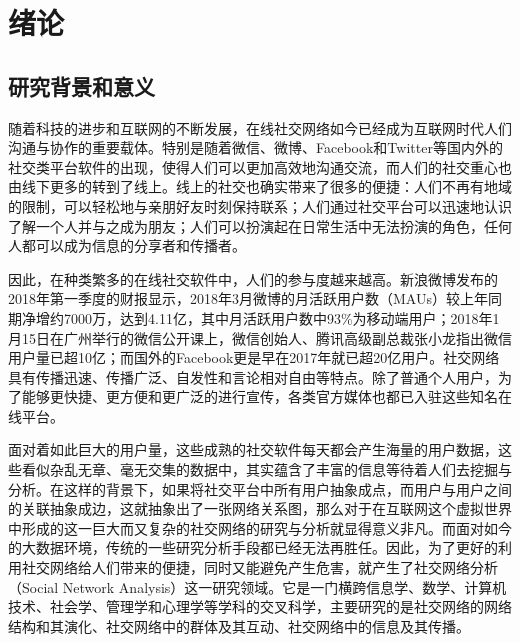 \chapter{绪论}

\section{研究背景和意义}%
随着科技的进步和互联网的不断发展，在线社交网络如今已经成为互联网时代人们沟通与协作的重要载体。特别是随着微信、微博、Facebook和Twitter等国内外的社交类平台软件的出现，使得人们可以更加高效地沟通交流，而人们的社交重心也由线下更多的转到了线上。线上的社交也确实带来了很多的便捷：人们不再有地域的限制，可以轻松地与亲朋好友时刻保持联系；人们通过社交平台可以迅速地认识了解一个人并与之成为朋友；人们可以扮演起在日常生活中无法扮演的角色，任何人都可以成为信息的分享者和传播者。

因此，在种类繁多的在线社交软件中，人们的参与度越来越高。新浪微博发布的2018年第一季度的财报显示，2018年3月微博的月活跃用户数（MAUs）较上年同期净增约7000万，达到4.11亿，其中月活跃用户数中93\%为移动端用户；2018年1月15日在广州举行的微信公开课上，微信创始人、腾讯高级副总裁张小龙指出微信用户量已超10亿；而国外的Facebook更是早在2017年就已超20亿用户。社交网络具有传播迅速、传播广泛、自发性和言论相对自由等特点。除了普通个人用户，为了能够更快捷、更方便和更广泛的进行宣传，各类官方媒体也都已入驻这些知名在线平台。

面对着如此巨大的用户量，这些成熟的社交软件每天都会产生海量的用户数据，这些看似杂乱无章、毫无交集的数据中，其实蕴含了丰富的信息等待着人们去挖掘与分析。在这样的背景下，如果将社交平台中所有用户抽象成点，而用户与用户之间的关联抽象成边，这就抽象出了一张网络关系图，那么对于在互联网这个虚拟世界中形成的这一巨大而又复杂的社交网络的研究与分析就显得意义非凡。而面对如今的大数据环境，传统的一些研究分析手段都已经无法再胜任。因此，为了更好的利用社交网络给人们带来的便捷，同时又能避免产生危害，就产生了社交网络分析（Social Network Analysis）这一研究领域。它是一门横跨信息学、数学、计算机技术、社会学、管理学和心理学等学科的交叉科学，主要研究的是社交网络的网络结构和其演化、社交网络中的群体及其互动、社交网络中的信息及其传播。

